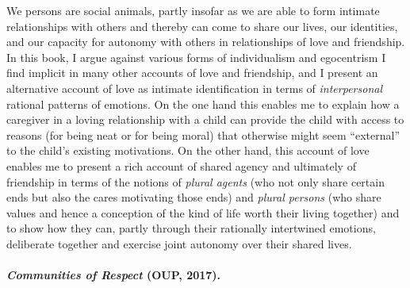 \documentclass[%
  11pt,%
]{article}
\begin{document}
We persons are social animals, partly insofar as we are able to form intimate relationships with others and thereby can come to share our lives, our identities, and our capacity for autonomy with others in relationships of love and friendship. In this book, I argue against various forms of individualism and egocentrism I find implicit in many other accounts of love and friendship, and I present an alternative account of love as intimate identification in terms of \emph{interpersonal} rational patterns of emotions. On the one hand this enables me to explain how a caregiver in a loving relationship with a child can provide the child with access to reasons (for being neat or for being moral) that otherwise might seem \enquote{external} to the child's existing motivations. On the other hand, this account of love enables me to present a rich account of shared agency and ultimately of friendship in terms of the notions of \emph{plural agents} (who not only share certain ends but also the cares motivating those ends) and \emph{plural persons} (who share values and hence a conception of the kind of life worth their living together) and to show how they can, partly through their rationally intertwined emotions, deliberate together and exercise joint autonomy over their shared lives.

\paragraph{\emph{Communities of Respect} (OUP, 2017).}
\end{document}
